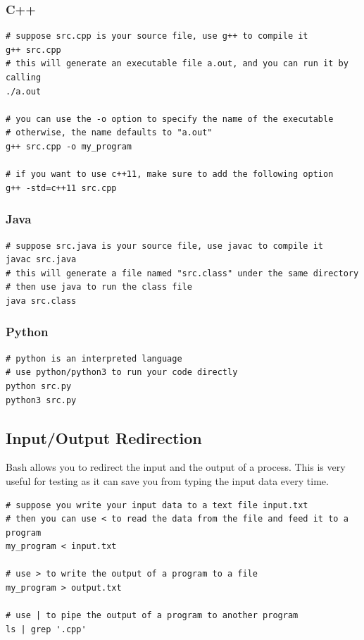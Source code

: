 \documentclass {article}
\begin{document}
\subsubsection{C++}
\begin{verbatim}
# suppose src.cpp is your source file, use g++ to compile it
g++ src.cpp
# this will generate an executable file a.out, and you can run it by calling
./a.out

# you can use the -o option to specify the name of the executable
# otherwise, the name defaults to "a.out"
g++ src.cpp -o my_program

# if you want to use c++11, make sure to add the following option
g++ -std=c++11 src.cpp
\end{verbatim}

\subsubsection{Java}
\begin{verbatim}
# suppose src.java is your source file, use javac to compile it
javac src.java
# this will generate a file named "src.class" under the same directory
# then use java to run the class file
java src.class
\end{verbatim}

\subsubsection{Python}
\begin{verbatim}
# python is an interpreted language
# use python/python3 to run your code directly
python src.py
python3 src.py
\end{verbatim}

\newpage
\subsection{Input/Output Redirection}
Bash allows you to redirect the input and the output of a process.
This is very useful for testing as it can save you from typing 
the input data every time.\\
\begin{verbatim}
# suppose you write your input data to a text file input.txt
# then you can use < to read the data from the file and feed it to a program
my_program < input.txt

# use > to write the output of a program to a file
my_program > output.txt

# use | to pipe the output of a program to another program
ls | grep '.cpp'
\end{verbatim}
\end{document}
